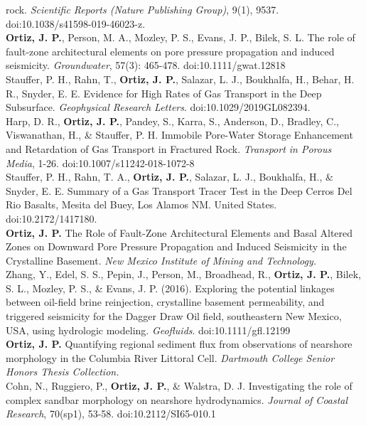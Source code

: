 \documentclass[11pt, letterpaper]{article}
\newcommand{\years}[1]{\marginnote{\scriptsize #1}}
\begin{document}
rock. \emph{Scientific Reports (Nature Publishing Group)}, 9(1), 9537.
doi:10.1038/s41598-019-46023-z. \\ 
\years{2019}\textbf{Ortiz, J. P.}, Person,
M. A., Mozley, P. S., Evans, J. P., Bilek, S. L. The role of fault-zone
architectural elements on pore pressure propagation and induced seismicity.
\emph{Groundwater}, 57(3): 465-478. doi:10.1111/gwat.12818\\
\years{2019}Stauffer, P. H., Rahn, T., \textbf{Ortiz, J. P.}, Salazar, L. J.,
Boukhalfa, H., Behar, H. R., Snyder, E. E. Evidence for High Rates of Gas
Transport in the Deep Subsurface. \emph{Geophysical Research Letters}.
doi:10.1029/2019GL082394.\\ 
\years{2018}Harp, D. R., \textbf{Ortiz, J. P.},
Pandey, S., Karra, S., Anderson, D., Bradley, C., Viswanathan, H., \& Stauffer,
P. H. Immobile Pore-Water Storage Enhancement and Retardation of Gas Transport
in Fractured Rock. \emph{Transport in Porous Media}, 1-26.
doi:10.1007/s11242-018-1072-8\\ 
\years{2018}Stauffer, P. H., Rahn, T. A.,
\textbf{Ortiz, J. P.}, Salazar, L. J., Boukhalfa, H., \& Snyder, E. E. Summary
of a Gas Transport Tracer Test in the Deep Cerros Del Rio Basalts, Mesita del
Buey, Los Alamos NM. United States. doi:10.2172/1417180.\\
\years{2017}\textbf{Ortiz, J. P.} The Role of Fault-Zone Architectural Elements
and Basal Altered Zones on Downward Pore Pressure Propagation and Induced
Seismicity in the Crystalline Basement. \emph{New Mexico Institute of Mining
and Technology.}\\ 
\years{2016}Zhang, Y., Edel, S. S., Pepin, J., Person, M.,
Broadhead, R., \textbf{Ortiz, J. P.}, Bilek, S. L., Mozley, P. S., \& Evans, J.
P. (2016). Exploring the potential linkages between oil-field brine
reinjection, crystalline basement permeability, and triggered seismicity for
the Dagger Draw Oil field, southeastern New Mexico, USA, using hydrologic
modeling. \emph{Geofluids}. doi:10.1111/gfl.12199\\
\years{2014}\textbf{Ortiz, J. P.} Quantifying regional sediment flux from
observations of nearshore morphology in the Columbia River Littoral Cell.
\emph{Dartmouth College Senior Honors Thesis Collection.}\\ 
\years{2014}Cohn, N., Ruggiero, P., \textbf{Ortiz, J. P.}, \& Walstra, D. J.
Investigating the role of complex sandbar morphology on nearshore
hydrodynamics. \emph{Journal of Coastal Research}, 70(sp1), 53-58.
doi:10.2112/SI65-010.1
\end{document}
